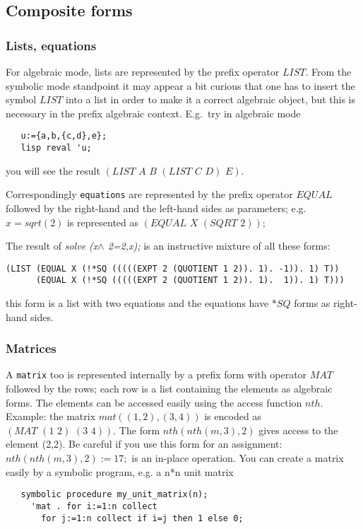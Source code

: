 \subsection{Composite forms}

\subsubsection{Lists, equations}

For algebraic mode, lists are represented by the prefix
operator $LIST$. From the symbolic mode standpoint it may 
appear a bit curious that one has to insert
the symbol $LIST$ into a list in order to make it
a correct algebraic object, but this is necessary
in the prefix algebraic context.
E.g.\ try in algebraic mode

\begin{verbatim}
   u:={a,b,{c,d},e};
   lisp reval 'u;
\end{verbatim}
you will see the result $(LIST\,\, A\,\, B\,\, (LIST\,\, C\,\, D)\,\, E)$.

Correspondingly {\tt equations} are represented by
the prefix operator $EQUAL$ followed by the right-hand and
the left-hand sides as parameters; e.g.\  $x=sqrt(2)$
is represented as $(EQUAL\,\, X\,\,(SQRT\,\, 2))$;

The result of {\em solve (x$\wedge$ 2=2,x);} is an instructive
mixture of all these forms:
\begin{verbatim}
(LIST (EQUAL X (!*SQ (((((EXPT 2 (QUOTIENT 1 2)). 1). -1)). 1) T)) 
      (EQUAL X (!*SQ (((((EXPT 2 (QUOTIENT 1 2)). 1).  1)). 1) T)))
\end{verbatim}
this form is a list with two equations and the equations
have $*SQ$ forms as right-hand sides.

\subsubsection{Matrices}

A {\tt matrix} too is represented internally by
a prefix form with operator $MAT$ followed by the rows;
each row is a list containing the elements as algebraic
forms. The elements can be accessed easily using the
access function $nth$. Example: the matrix $mat((1,2),(3,4))$
is encoded as $(MAT\,\,(1\,\, 2)\,\, (3\,\, 4))$.
The form $nth(nth(m,3),2)$ gives access to the element (2,2).
Be careful if you use this form for an assignment:
$nth(nth(m,3),2):=17;$ is an in-place operation.
You can create a matrix easily by a symbolic program, e.g.
a n*n unit matrix
\begin{verbatim}
   symbolic procedure my_unit_matrix(n);
     'mat . for i:=1:n collect
       for j:=1:n collect if i=j then 1 else 0;
\end{verbatim}

